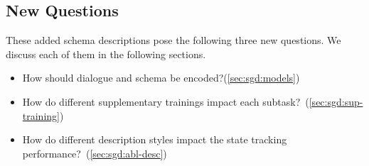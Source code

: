 \subsection{New Questions}
\label{ssec:sgd:new-questions}
These added schema descriptions pose the following three new
questions. We discuss each of them in the following sections.

\begin{itemize}
\item How should dialogue and schema be encoded?(\autoref{sec:sgd:models})
\item How do different supplementary trainings impact each subtask?~(\autoref{sec:sgd:sup-training})
\item How do different description styles impact the state tracking performance?~(\autoref{sec:sgd:abl-desc})
\end{itemize}


